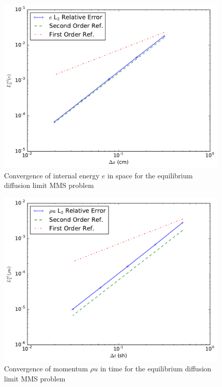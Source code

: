 \documentclass[preprint,12pt]{elsarticle}
\begin{document}
\begin{figure}[ht]
   \centering
   \includegraphics[width=\textwidth]{figures/MMS_diffusion_limit_e_convergence.pdf}
   \caption{Convergence of internal energy $e$ in space for the equilibrium diffusion limit MMS problem}
   \label{fig:diff_limit_e}
\end{figure}
\begin{figure}[ht]
   \centering
   \includegraphics[width=\textwidth]{figures/MMS_diffusion_limit_rhou_convergence.pdf}
   \caption{Convergence of momentum $\rho u$ in time for the equilibrium diffusion limit MMS problem}
   \label{fig:diff_limit_mom}
\end{figure}
\end{document}
